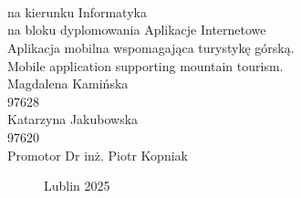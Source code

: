 \documentclass[12pt,a4paper]{article}
\def\blankpage{%
      \clearpage%
      \thispagestyle{empty}%
      \null%
      \clearpage}
\newcommand{\newCharapter}[1]{\newpage }
\begin{document}

\begin{titlepage}

    \titlepagefont
     \\
    \vspace{4cm}
    \break
    \fontsize{1.4cm}{1.4cm} \\
    \fontsize{1.4cm}{1.4cm} \\
    \vspace{0.5cm}
    \break
    \normalsize{} na kierunku Informatyka \\
    na bloku dyplomowania Aplikacje Internetowe \\
    \vspace{1cm}
    \break
    \large
    Aplikacja mobilna wspomagająca turystykę górską. \\
    Mobile application supporting mountain tourism. \\
    \vspace{1.5cm}
    \break
    Magdalena Kamińska \\
    97628   \\
    \vspace{0.5cm}
    \break
    Katarzyna Jakubowska \\
    97620   \\
    \vspace{1.5cm}
    \break
    \normalsize{}
    Promotor Dr inż. Piotr Kopniak
    \vspace*{\fill}
    \vspace{0.5cm}
    \begin{figure}[bbp]
        {\titlepagefont Lublin 2025}
    \end{figure}
\end{titlepage}
\newpage

\onehalfspacing
\blankpage

\tableofcontents
\newCharapter{chapters/chapter0}
\setcounter{figure}{0}
\newCharapter{chapters/chapter1}
\setcounter{figure}{0}
\newCharapter{chapters/chapter2}
\setcounter{figure}{0}
\newCharapter{chapters/chapter3}
\setcounter{figure}{0}
\newCharapter{chapters/chapter4}
\setcounter{figure}{0}
\newCharapter{chapters/chapter5}
\setcounter{figure}{0}
\newCharapter{chapters/chapter6}
\setcounter{figure}{0}
\newCharapter{chapters/testy}
\setcounter{figure}{0}
\newCharapter{chapters/chapter7}


\printbibliography[type=book, title={Źródła naukowe}]
\printbibliography[type=online,title={Źródła internetowe}]
\printbibliography[sorting=nyt, title={Bibliografia}]
\end{document}
